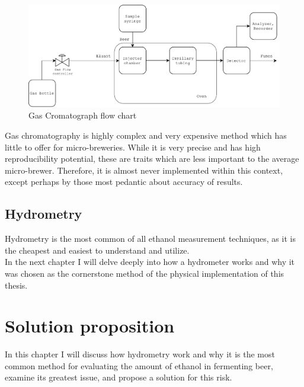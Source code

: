 \documentclass[twoside]{ctuthesis}
\theoremstyle{plain}
\theoremstyle{definition}
\theoremstyle{note}
\begin{document}
\begin{figure}[H]
	\centering
	\includegraphics[width = \textwidth]{Gas_Chromatograph_PDF}
	\caption{Gas Cromatograph flow chart}
\end{figure}

Gas chromatography is highly complex and very expensive method which has little to offer for micro-breweries. While it is very precise and has high reproducibility potential, these are traits which are less important to the average micro-brewer. Therefore, it is almost never implemented within this context, except perhaps by those most pedantic about accuracy of results.

\newpage

\section{Hydrometry}
Hydrometry is the most common of all ethanol measurement techniques, as it is the cheapest and easiest to understand and utilize.\\
In the next chapter I will delve deeply into how a hydrometer works and why it was chosen as the cornerstone method of the physical implementation of this thesis.


\chapter{Solution proposition}
In this chapter I will discuss how hydrometry work and why it is the most common method for evaluating the amount of ethanol in fermenting beer, examine its greatest issue, and propose a solution for this risk.
\end{document}
